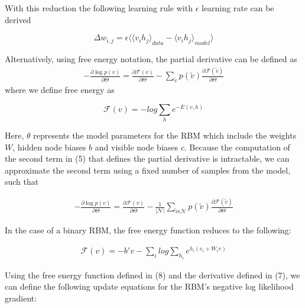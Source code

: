 \documentclass[journal]{IEEEtran}
\begin{document}
With this reduction the following learning rule with $\epsilon$ learning rate can be derived

\begin{equation}
\Delta w_{i,j} = \epsilon\langle{\langle v_{i} h_{j} \rangle}_{data} - {\langle v_{i} h_{j} \rangle}_{model}\rangle 
\end{equation} 

Alternatively, using free energy notation, the partial derivative can be defined as
\begin{equation}
\begin{aligned}
- \frac{\partial \log p(v)}{\partial \Theta} = \frac{\partial \mathcal{F}(v)}{\partial \Theta} - \sum\limits_{\tilde{v}}p(\tilde{v}) \frac{\partial \mathcal{F}(\tilde{v})}{\partial \Theta}
\end{aligned}
\end{equation} where we define free energy as 

\begin{equation}
\mathcal{F}(v) = -log \sum\limits_{h}e^{-E(v,h)}
\end{equation} 

Here, $\theta$ represents the model parameters for the RBM which include the weights $W$, hidden node biases $b$ and visible node biases $c$. Because the computation of the second term in (5) that defines the partial derivative is intractable, we can approximate the second term using a fixed number of samples from the model, such that 

\begin{equation}
\begin{aligned}
- \frac{\partial \log p(v)}{\partial \Theta} = \frac{\partial \mathcal{F}(v)}{\partial \Theta} -\frac{1}{|\mathcal{N}|} \sum\limits_{\tilde{v} \epsilon \mathcal{N}} p(\tilde{v}) \frac{\partial \mathcal{F}(\tilde{v})}{\partial \Theta}
\end{aligned}
\end{equation}

In the case of a binary RBM, the free energy function reduces to the following:

\begin{equation}
\begin{aligned}
\mathcal{F}(v) = -b'v - \sum\limits_{i}log\sum\limits_{h_{i}}e^{h_{i}(c_{i}+W_{i}v)}
\end{aligned}
\end{equation}

Using the free energy function defined in (8) and the derivative defined in (7), we can define the following update equations for the RBM's negative log likelihood gradient:
\end{document}
